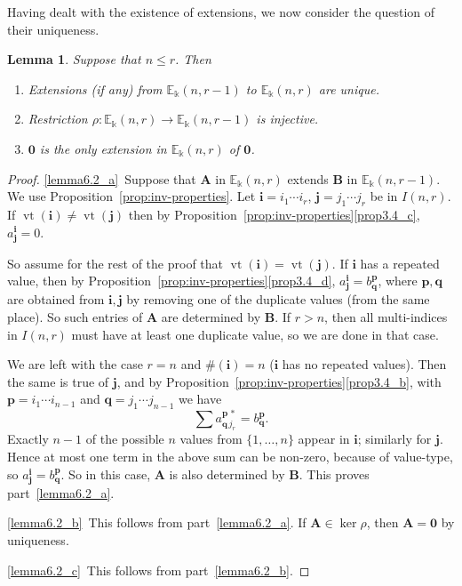\documentclass[10pt]{article}
\newtheorem{lemm}[theorem]{Lemma}
\theoremstyle{definition}
\DeclareMathOperator{\vt}{vt}
\newcommand{\E}{\mathbb{E}}
\newcommand{\bi}{{\boldsymbol{i}}} %
\newcommand{\bj}{{\boldsymbol{j}}}
\newcommand{\bp}{{\boldsymbol{p}}}
\newcommand{\bq}{{\boldsymbol{q}}}
\newcommand{\bA}{\mathbf{A}}
\newcommand{\bB}{\mathbf{B}}
\newcommand{\bzero}{\mathbf{0}}
\begin{document}
Having dealt with the existence of extensions, we now consider the
question of their uniqueness.

\begin{lemm}\label{lem:rho-injects}
 Suppose that $n \le r$. Then
 \begin{enumerate}[label=(\alph*)]
 \item\label{lemma6.2_a} Extensions \textup{(}if any\textup{)} from $\E_\Bbbk(n,r-1)$
 to $\E_\Bbbk(n,r)$ are unique.
 \item\label{lemma6.2_b} Restriction $\rho: \E_\Bbbk(n,r) \to \E_\Bbbk(n,r-1)$ is
 injective.
 \item\label{lemma6.2_c} $\bzero$ is the only extension in $\E_\Bbbk(n,r)$ of $\bzero$.
 \end{enumerate}
\end{lemm}

\begin{proof}
\ref{lemma6.2_a}~Suppose that $\bA$ in $\E_\Bbbk(n,r)$ extends $\bB$ in
 $\E_\Bbbk(n,r-1)$. We use Proposition~\ref{prop:inv-properties}. Let
 $\bi = i_1 \cdots i_r$, $\bj = j_1 \cdots j_r$ be in $I(n,r)$. If
 $\vt(\bi) \ne \vt(\bj)$ then by Proposition~\ref{prop:inv-properties}\ref{prop3.4_c}, $a^\bi_\bj = 0$.

\goodbreak
 So assume for the rest of the proof that $\vt(\bi) = \vt(\bj)$. If
 $\bi$ has a repeated value, then by Proposition~\ref{prop:inv-properties}\ref{prop3.4_d}, $a^\bi_\bj = b^\bp_\bq$, where $\bp,
 \bq$ are obtained from $\bi, \bj$ by removing one of the duplicate
 values (from the same place). So such entries of $\bA$ are
 determined by $\bB$. If $r>n$, then all multi-indices in $I(n,r)$
 must have at least one duplicate value, so we are done in that case.

 We are left with the case $r=n$ and $\#(\bi) = n$ ($\bi$ has no
 repeated values). Then the same is true of $\bj$, and by Proposition~\ref{prop:inv-properties}\ref{prop3.4_b}, with $\bp = i_1 \cdots i_{n-1}$ and
 $\bq = j_1 \cdots j_{n-1}$ we have
 \[
 \textstyle \sum a^{\bp\,*}_{\bq\,j_r} = b^\bp_\bq .
 \]
 Exactly $n-1$ of the possible $n$ values from $\{1, \dots, n\}$
 appear in $\bi$; similarly for $\bj$. Hence at most one term in the
 above sum can be non-zero, because of value-type, so $a^\bi_\bj =
 b^\bp_\bq$. So in this case, $\bA$ is also determined by $\bB$. This
 proves part~\ref{lemma6.2_a}.

\ref{lemma6.2_b}~This follows from part~\ref{lemma6.2_a}. If $\bA \in \ker \rho$, then $\bA =
 \bzero$ by uniqueness.

\ref{lemma6.2_c}~This follows from part~\ref{lemma6.2_b}.
\end{proof}
\end{document}
